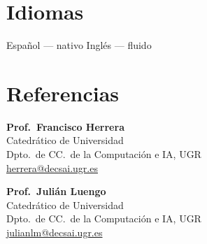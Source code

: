 \documentclass[10pt,a4paper]{article}
\newcommand{\sub}[1]{\textcolor{subtle}{\footnotesize #1}}
\begin{document}
\section*{Idiomas}

Español --- nativo \quad\textbar\quad Inglés --- fluido

\section*{Referencias}

\begin{minipage}[t]{0.48\textwidth}
    \textbf{Prof.~Francisco Herrera} \\
    \sub{Catedrático de Universidad \\ Dpto.~de CC.~de la Computación e IA, UGR \\ \href{mailto:herrera@decsai.ugr.es}{herrera@decsai.ugr.es}}
\end{minipage}\hfill
\begin{minipage}[t]{0.48\textwidth}
    \textbf{Prof.~Julián Luengo} \\
    \sub{Catedrático de Universidad \\ Dpto.~de CC.~de la Computación e IA, UGR \\ \href{mailto:julianlm@decsai.ugr.es}{julianlm@decsai.ugr.es}}
\end{minipage}
\end{document}
